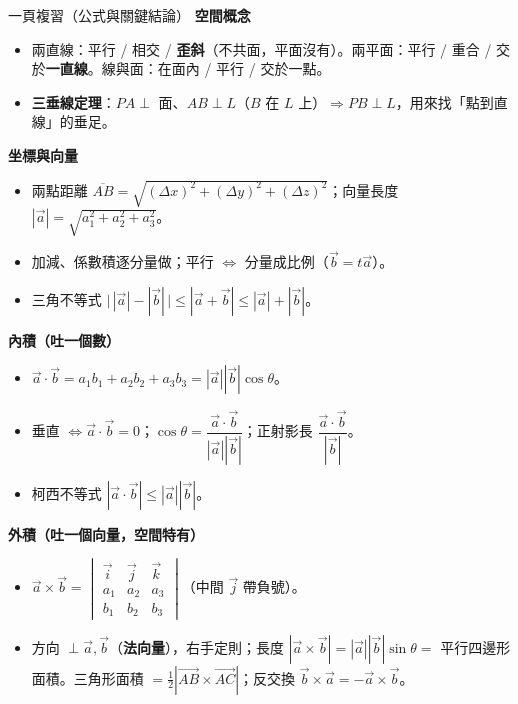 \documentclass[11pt]{article}
\begin{document}
\begin{補充框}{一頁複習（公式與關鍵結論）}
\textbf{空間概念}
\begin{itemize}\setlength{\itemsep}{1pt}
\item 兩直線：平行 / 相交 / \textbf{歪斜}（不共面，平面沒有）。兩平面：平行 / 重合 / 交於\textbf{一直線}。線與面：在面內 / 平行 / 交於一點。
\item \textbf{三垂線定理}：$PA\perp$ 面、$AB\perp L$（$B$ 在 $L$ 上）$\Rightarrow PB\perp L$，用來找「點到直線」的垂足。
\end{itemize}

\textbf{坐標與向量}
\begin{itemize}\setlength{\itemsep}{1pt}
\item 兩點距離 $\overline{AB}=\sqrt{(\Delta x)^2+(\Delta y)^2+(\Delta z)^2}$；向量長度 $|\vec a|=\sqrt{a_1^2+a_2^2+a_3^2}$。
\item 加減、係數積逐分量做；平行 $\iff$ 分量成比例（$\vec b=t\vec a$）。
\item 三角不等式 $\bigl|\,|\vec a|-|\vec b|\,\bigr|\le|\vec a+\vec b|\le|\vec a|+|\vec b|$。
\end{itemize}

\textbf{內積（吐一個數）}
\begin{itemize}\setlength{\itemsep}{1pt}
\item $\vec a\cdot\vec b=a_1b_1+a_2b_2+a_3b_3=|\vec a||\vec b|\cos\theta$。
\item 垂直 $\iff\vec a\cdot\vec b=0$；$\cos\theta=\dfrac{\vec a\cdot\vec b}{|\vec a||\vec b|}$；正射影長 $\dfrac{\vec a\cdot\vec b}{|\vec b|}$。
\item 柯西不等式 $|\vec a\cdot\vec b|\le|\vec a||\vec b|$。
\end{itemize}

\textbf{外積（吐一個向量，空間特有）}
\begin{itemize}\setlength{\itemsep}{1pt}
\item $\vec a\times\vec b=\begin{vmatrix}\vec i&\vec j&\vec k\\ a_1&a_2&a_3\\ b_1&b_2&b_3\end{vmatrix}$（中間 $\vec j$ 帶負號）。
\item 方向 $\perp\vec a,\vec b$（\textbf{法向量}），右手定則；長度 $|\vec a\times\vec b|=|\vec a||\vec b|\sin\theta=$ 平行四邊形面積。三角形面積 $=\tfrac12|\vec{AB}\times\vec{AC}|$；反交換 $\vec b\times\vec a=-\vec a\times\vec b$。
\end{itemize}


\end{補充框}
\end{document}
